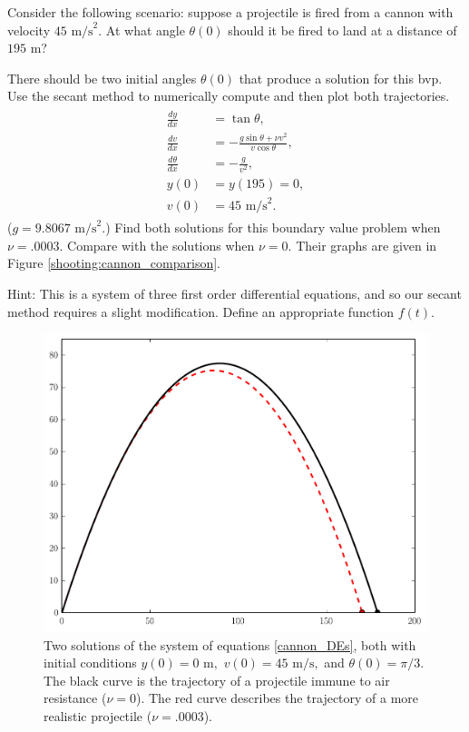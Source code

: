 \begin{problem}
Consider the following scenario: suppose a projectile is fired from a cannon with velocity $45\text{ m/s}^2.$ At what angle $\theta(0)$ should it be fired to land at a distance of $195\text{ m}$? 

There should be two initial angles $\theta(0)$ that produce a solution for this bvp. Use the secant method to numerically compute and then plot both trajectories.
\begin{align}
	\label{cannon_shooting}
	\begin{split}
\frac{dy}{dx} &= \tan {\theta} ,\\
\frac{dv}{dx} &= -\frac{g \sin{\theta} + \nu v^2}{v \cos{\theta}},\\
\frac{d\theta}{dx} &= -\frac{g}{v^2},\\
y(0)&= y(195) = 0,\\
v(0) &= 45 \text{ m/s}^2.
	\end{split}
\end{align}
($g = 9.8067\text{ m/s}^2.$) Find both solutions for this boundary value problem when $\nu = .0003$. Compare with the solutions when $\nu = 0.$ Their graphs are given in Figure \eqref{shooting:cannon_comparison}.

Hint: This is a system of three first order differential equations, and so our secant method requires a slight modification. Define an appropriate function $f(t)$. 
\end{problem}

\begin{figure}[ht]
\centering
\includegraphics[width=\textwidth]{Cannon_with_AirResistance.pdf}
\caption{Two solutions of the system of equations \eqref{cannon_DEs}, both with initial conditions  $y(0) = 0 \text{ m},$ $ v(0) = 45 \text{ m/s},$ and $\theta(0)=\pi/3$. The black curve is the trajectory of a projectile immune to air resistance ($\nu = 0$). The red curve describes the trajectory of a more realistic projectile ($\nu = .0003$). }
\label{shooting:cannon_comparison}
\end{figure}


